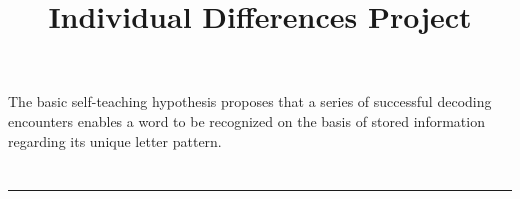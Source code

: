 \documentclass[]{article}
\begin{document}
	\title{Individual Differences Project}
	\author{}
	
	\maketitle
	\tableofcontents
	
	\raggedright
	
	The basic self-teaching hypothesis proposes that a series of successful decoding encounters enables a word to be recognized on the basis of stored information regarding its unique letter pattern.
	
	\section{\citet*{sharePhonologicalRecodingSelfteaching1995}}
	\rule{\textwidth}{.4pt}
	
\end{document}
